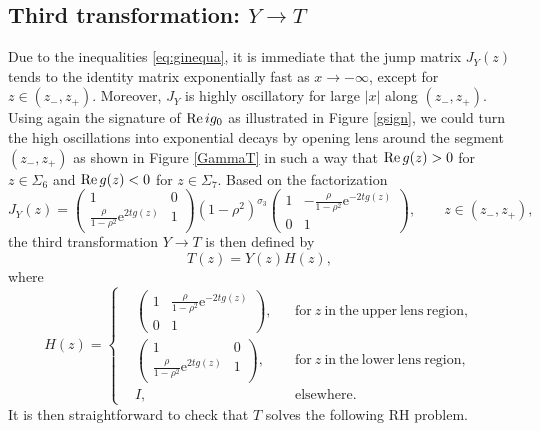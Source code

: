 \documentclass[11pt,a4paper]{article}
\numberwithin{equation}{section}
\def\Re {\mathop{\rm Re}\nolimits}
\begin{document}
\subsection{Third transformation: $Y \to T$}
Due to the inequalities \eqref{eq:ginequa}, it is immediate that the jump matrix $J_{Y}(z)$ tends to the identity matrix exponentially fast as $x\to-\infty$, except for $z \in (z_-,z_+)$. Moreover, $J_{Y}$ is highly oscillatory for large $|x|$ along $(z_-,z_+)$.
Using again  the signature of $\Re ig_0$ as illustrated in Figure \ref{gsign}, we could turn the high oscillations into exponential decays by opening lens around the segment $(z_-,z_+)$ as shown in Figure \ref{GammaT} in such a way that $\Re g(z)>0$ for $z\in \Sigma_6$ and $\Re g(z)<0$ for $z\in \Sigma_7$. Based on the factorization
$$
J_Y(z)=\begin{pmatrix}1 & 0 \\ \frac{\rho}{1-\rho^{2}} \mathrm{e}^{2tg(z)} & 1 \end{pmatrix}
(1-\rho^2)^{\sigma_3}
\begin{pmatrix} 1 & -\frac{\rho}{1-\rho^{2}} \mathrm{e}^{-2tg(z)} \\ 0 & 1 \end{pmatrix}, \qquad z\in(z_-,z_+),
$$
the third transformation $Y\to{T}$  is then defined by
\begin{equation}\label{T-transformation}
T(z)=Y(z)H(z),
\end{equation}
where
\begin{equation}\label{H-expression}
H(z)=\left\{\begin{aligned}
&\begin{pmatrix}1 & \frac{\rho}{1-\rho^{2}} \mathrm{e}^{-2tg(z)} \\ 0 & 1 \end{pmatrix}, &&\mathrm{for}~z~\mathrm{in}~\mathrm{the}~\mathrm{upper}~\mathrm{lens}~\mathrm{region},\\
&\begin{pmatrix}1 & 0 \\ \frac{\rho}{1-\rho^{2}} \mathrm{e}^{2tg(z)} & 1 \end{pmatrix},
&&\mathrm{for}~z~\mathrm{in}~\mathrm{the}~\mathrm{lower}~\mathrm{lens}~\mathrm{region},\\
&I, && \mathrm{elsewhere}.
\end{aligned}\right.
\end{equation}
It is then straightforward to check that ${T}$ solves the following RH problem.
\end{document}
